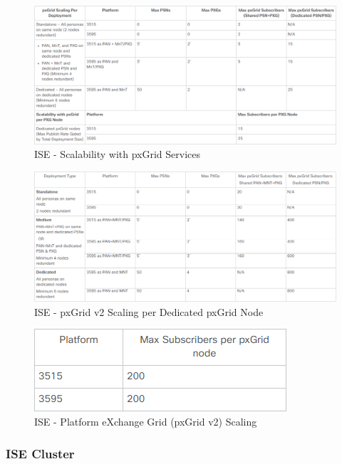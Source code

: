 \begin{figure}[H]
	\centering
	\includegraphics[width=1\linewidth]{img/Absicherung/ISE-pxGridServicesScalability}
	\caption{ISE - Scalability with pxGrid Services \cite{ise-scale}}
	\label{fig:ISE - Scalability with pxGrid Service}
\end{figure}

\begin{figure}[H]
	\centering
	\includegraphics[width=1\linewidth]{img/Absicherung/ISE-PlatformpxGridV2Scaling}
	\caption{ISE - pxGrid v2 Scaling per Dedicated pxGrid Node \cite{ise-scale}}
	\label{fig:ISE - pxGrid v2 Scaling per Dedicated pxGrid Node}
\end{figure}

\begin{figure}[H]
	\centering
	\includegraphics[width=0.5\linewidth]{img/Absicherung/ISE-pxGridV2}
	\caption{ISE - Platform eXchange Grid (pxGrid v2) Scaling \cite{ise-scale}}
	\label{fig:ISE - Platform eXchange Grid (pxGrid v2) Scaling}
\end{figure}

\subsubsection{ISE Cluster}

